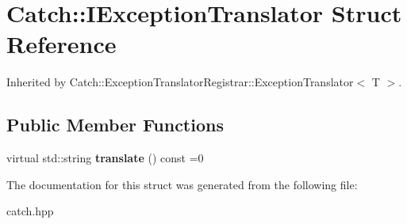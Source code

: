 \hypertarget{structCatch_1_1IExceptionTranslator}{
\section{Catch::IExceptionTranslator Struct Reference}
\label{structCatch_1_1IExceptionTranslator}
}


Inherited by Catch::ExceptionTranslatorRegistrar::ExceptionTranslator$<$ T $>$.\subsection*{Public Member Functions}
\begin{DoxyCompactItemize}
\item 
\hypertarget{structCatch_1_1IExceptionTranslator_ade89aa305d8c89576521e76b2d1f82eb}{
virtual std::string {\bfseries translate} () const =0}
\label{structCatch_1_1IExceptionTranslator_ade89aa305d8c89576521e76b2d1f82eb}

\end{DoxyCompactItemize}


The documentation for this struct was generated from the following file:\begin{DoxyCompactItemize}
\item 
catch.hpp\end{DoxyCompactItemize}
